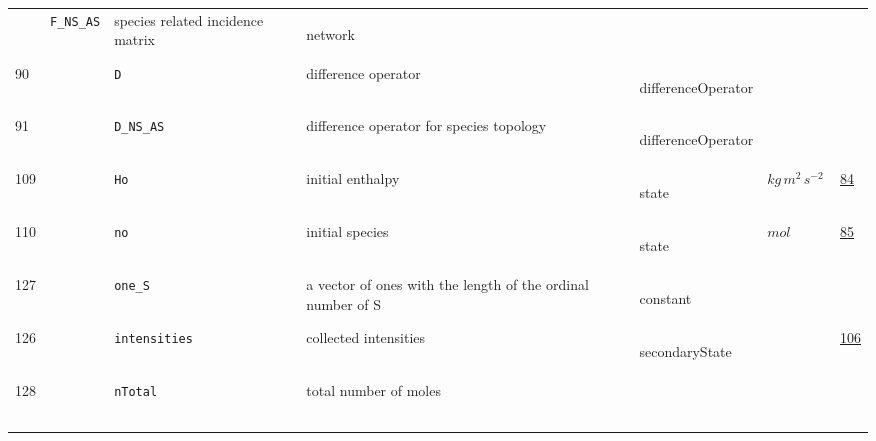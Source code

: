 \begin{longtable}{|p{1cm}|p{2.5cm}|p{4.5cm}|p{8cm}|p{3.0cm}|p{3cm}|p{1cm}|}
             & \verb|F_NS_AS|
             & species related incidence matrix
             & \begin{lay}network \end{lay}
             & $  $
             & \\
        90
             & \hypertarget{"v:90"}{ $ {} $}
             & \verb|D|
             & difference operator
             & \begin{lay}differenceOperator \end{lay}
             & $  $
             & \\
        91
             & \hypertarget{"v:91"}{ $ {} $}
             & \verb|D_NS_AS|
             & difference operator for species topology
             & \begin{lay}differenceOperator \end{lay}
             & $  $
             & \\
        109
             & \hypertarget{"v:109"}{ $ {} $}
             & \verb|Ho|
             & initial enthalpy
             & \begin{lay}state \end{lay}
             & $ kg \,m^{2} \,s^{-2} \, $
             &                 \hyperlink{"e:84"}{ 84 }
                 \\
        110
             & \hypertarget{"v:110"}{ $ {} $}
             & \verb|no|
             & initial species
             & \begin{lay}state \end{lay}
             & $ mol \, $
             &                 \hyperlink{"e:85"}{ 85 }
                 \\
        127
             & \hypertarget{"v:127"}{ $ {} $}
             & \verb|one_S|
             & a vector of ones with the length of the ordinal number of S
             & \begin{lay}constant \end{lay}
             & $  $
             & \\
        126
             & \hypertarget{"v:126"}{ $ {} $}
             & \verb|intensities|
             & collected intensities
             & \begin{lay}secondaryState \end{lay}
             & $  $
             &                 \hyperlink{"e:106"}{ 106 }
                 \\
        128
             & \hypertarget{"v:128"}{ $ {} $}
             & \verb|nTotal|
             & total number of moles

\end{longtable}
